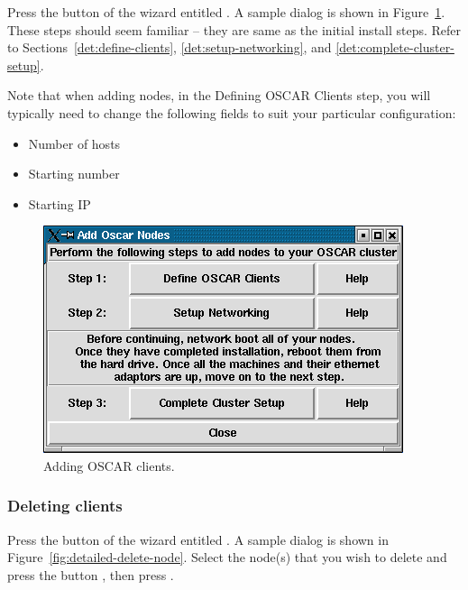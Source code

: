 Press the button of the wizard entitled . A
sample dialog is shown in Figure~\ref{fig:detailed-add-node}. These
steps should seem familiar -- they are same as the initial install
steps.  Refer to Sections~\ref{det:define-clients},
\ref{det:setup-networking}, and \ref{det:complete-cluster-setup}.

Note that when adding nodes, in the Defining OSCAR Clients step, you
will typically need to change the following fields to suit your
particular configuration:

\begin{itemize}
\item Number of hosts
\item Starting number
\item Starting IP
\end{itemize}

\begin{figure}[htbp]
  \begin{center}
    \includegraphics[scale=\imgscale]{figs/9a_sbs-add-node}
    \caption{Adding OSCAR clients.}
    \label{fig:detailed-add-node}
  \end{center}
\end{figure}


\subsubsection{Deleting clients}
\label{det:deleting-clients}

Press the button of the wizard entitled .
A sample dialog is shown in Figure~\ref{fig:detailed-delete-node}.
Select the node(s) that you wish to delete and press the button
, then press .

